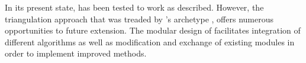 In its present state, \pname has been tested to work as described. However, the
triangulation approach that was treaded by \pname's archetype \hamstr, offers
numerous opportunities to future extension. The modular design of \pname
facilitates integration of different algorithms as well as modification and
exchange of existing modules in order to implement improved methods.
